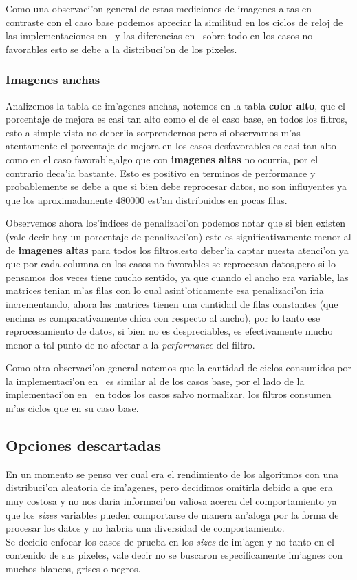 Como una observaci'on general de estas mediciones de imagenes altas en contraste con el caso base podemos apreciar la 
similitud en los ciclos de reloj de las implementaciones en \C \ y las diferencias en \ass \ sobre todo en los 
casos no favorables esto se debe a la distribuci'on de los pixeles.

\subsubsection{Imagenes anchas}
Analizemos la tabla de im'agenes anchas, notemos en la tabla \textbf{color alto}, que el porcentaje de mejora es
casi tan alto como el de el caso base, en todos los filtros, esto a simple vista no deber'ia
 sorprendernos pero si observamos m'as atentamente el porcentaje de mejora en los casos desfavorables es 
casi tan alto como en el caso favorable,algo que con \textbf{imagenes altas} no ocurria, por el contrario
deca'ia bastante. Esto es positivo en terminos de performance y probablemente se debe a que si bien
debe reprocesar datos, no son influyentes ya que los aproximadamente 480000 est'an distribuidos en
pocas filas.

Observemos ahora los'indices de penalizaci'on podemos notar que si bien existen (vale decir hay un porcentaje
 de penalizaci'on) este es significativamente menor al de \textbf{imagenes altas} para todos los filtros,esto
deber'ia captar nuesta atenci'on ya que por cada columna en los casos no favorables se reprocesan datos,pero
si lo pensamos dos veces tiene mucho sentido, ya que cuando el ancho era variable, las matrices
tenian m'as filas con lo cual asint'oticamente esa penalizaci'on iria incrementando, ahora las matrices
tienen una cantidad de filas constantes (que encima es comparativamente chica con respecto al ancho),
por lo tanto ese reprocesamiento de datos, si bien no es despreciables, es efectivamente mucho menor
a tal punto de no afectar a la \textit{performance} del filtro.

Como otra observaci'on general notemos que la cantidad de ciclos consumidos por la implementaci'on en \C \ es
similar al de los casos base, por el lado de la implementaci'on en \ass \ en todos los casos salvo normalizar,
los filtros consumen m'as ciclos que en su caso base.

\subsection{Opciones descartadas}
En un momento se penso ver cual era el rendimiento de los algoritmos con una distribuci'on 
aleatoria de im'agenes, pero decidimos omitirla debido a que era muy costosa y no nos 
daria informaci'on valiosa acerca del comportamiento ya que los \textit{sizes} variables pueden comportarse 
de manera an'aloga por la forma de procesar los datos y no habria una diversidad de comportamiento.\\
Se decidio enfocar los casos de prueba en los \textit{sizes} de im'agen y no tanto en el contenido de 
sus pixeles, vale decir no se buscaron especificamente im'agnes con muchos blancos, grises o negros.   


